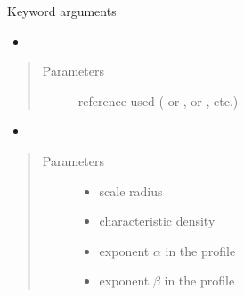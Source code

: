 \documentclass[letterpaper,10pt,english]{sphinxmanual}
\begin{document}
\begin{fulllineitems}
\sphinxAtStartPar
Keyword arguments
\begin{itemize}
\item {} 
\sphinxAtStartPar
{}

\end{itemize}
\begin{quote}\begin{description}
\item[{Parameters}] \leavevmode
\sphinxAtStartPar
{} \textendash{} reference used ( or \sphinxcode{\sphinxupquote{\textquotesingle{}1309.2641\textquotesingle{}}},  or \sphinxcode{\sphinxupquote{\textquotesingle{}1408.0002\textquotesingle{}}}, etc.)

\end{description}\end{quote}
\begin{itemize}
\item {} 
\sphinxAtStartPar
{}

\end{itemize}
\begin{quote}\begin{description}
\item[{Parameters}] \leavevmode\begin{itemize}
\item {} 
\sphinxAtStartPar
{} \textendash{} scale radius

\item {} 
\sphinxAtStartPar
{} \textendash{} characteristic density

\item {} 
\sphinxAtStartPar
{} \textendash{} exponent \(\alpha\) in the {\hyperref[\detokenize{diffsph.profiles:diffsph.profiles.templates.hdz}]{}} profile

\item {} 
\sphinxAtStartPar
{} \textendash{} exponent \(\beta\) in the {\hyperref[\detokenize{diffsph.profiles:diffsph.profiles.templates.hdz}]{}} profile


\end{itemize}
\end{description}
\end{quote}
\end{fulllineitems}
\end{document}
